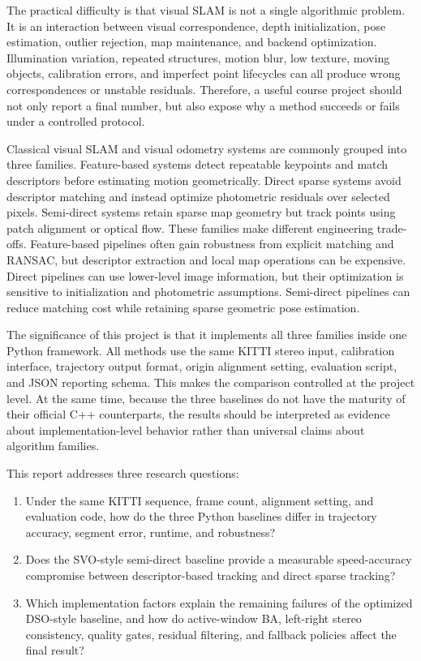 \documentclass[11pt,a4paper]{article}
\begin{document}
The practical difficulty is that visual SLAM is not a single algorithmic problem. It is an interaction between visual correspondence, depth initialization, pose estimation, outlier rejection, map maintenance, and backend optimization. Illumination variation, repeated structures, motion blur, low texture, moving objects, calibration errors, and imperfect point lifecycles can all produce wrong correspondences or unstable residuals. Therefore, a useful course project should not only report a final number, but also expose why a method succeeds or fails under a controlled protocol.

Classical visual SLAM and visual odometry systems are commonly grouped into three families. Feature-based systems detect repeatable keypoints and match descriptors before estimating motion geometrically. Direct sparse systems avoid descriptor matching and instead optimize photometric residuals over selected pixels. Semi-direct systems retain sparse map geometry but track points using patch alignment or optical flow. These families make different engineering trade-offs. Feature-based pipelines often gain robustness from explicit matching and RANSAC, but descriptor extraction and local map operations can be expensive. Direct pipelines can use lower-level image information, but their optimization is sensitive to initialization and photometric assumptions. Semi-direct pipelines can reduce matching cost while retaining sparse geometric pose estimation.

The significance of this project is that it implements all three families inside one Python framework. All methods use the same KITTI stereo input, calibration interface, trajectory output format, origin alignment setting, evaluation script, and JSON reporting schema. This makes the comparison controlled at the project level. At the same time, because the three baselines do not have the maturity of their official C++ counterparts, the results should be interpreted as evidence about implementation-level behavior rather than universal claims about algorithm families.

This report addresses three research questions:
\begin{enumerate}[leftmargin=2em]
  \item Under the same KITTI sequence, frame count, alignment setting, and evaluation code, how do the three Python baselines differ in trajectory accuracy, segment error, runtime, and robustness?
  \item Does the SVO-style semi-direct baseline provide a measurable speed-accuracy compromise between descriptor-based tracking and direct sparse tracking?
  \item Which implementation factors explain the remaining failures of the optimized DSO-style baseline, and how do active-window BA, left-right stereo consistency, quality gates, residual filtering, and fallback policies affect the final result?
\end{enumerate}
\end{document}
